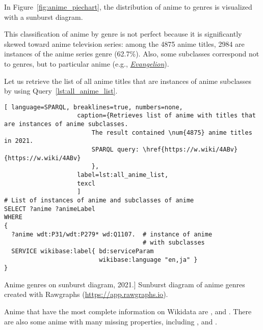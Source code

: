 In Figure~\ref{fig:anime_piechart}, the distribution of anime to genres is visualized with a sunburst diagram.

This classification of anime by genre is not perfect because it is significantly skewed toward anime television series: among the \num{4875} anime titles, \num{2984} are instances of the anime series genre (\num{62.7}\%). Also, some subclasses correspond not to genres, but to particular anime (e.g., \href{https://w.wiki/3iKe}{\emph{Evangelion}}).

Let us retrieve the list of all anime titles that are instances of anime subclasses by using Query~\ref{lst:all_anime_list}.

\begin{lstlisting}[ language=SPARQL, breaklines=true, numbers=none,
                    caption={Retrieves list of anime with titles that are instances of anime subclasses.
                        The result contained \num{4875} anime titles in 2021.
                        SPARQL query: \href{https://w.wiki/4ABv}{https://w.wiki/4ABv}
                        },
                    label=lst:all_anime_list,
                    texcl 
                    ]
# List of instances of anime and subclasses of anime
SELECT ?anime ?animeLabel
WHERE
{
  ?anime wdt:P31/wdt:P279* wd:Q1107.  # instance of anime
                                      # with subclasses
  SERVICE wikibase:label{ bd:serviceParam 
                          wikibase:language "en,ja" }
}
\end{lstlisting}%

\begin{marginfigure}[0.0cm]
{
	\setlength{\fboxsep}{0pt}%
	\setlength{\fboxrule}{1pt}%
}
\caption
[Anime genres on sunburst diagram, 2021.]
{
Sunburst diagram of anime genres created with Rawgraphs (\href{https://app.rawgraphs.io}{https://app.rawgraphs.io}).\newline
}
\label{fig:anime_piechart}
\end{marginfigure}

Anime that have the most complete information on Wikidata are ,  and . There are also some anime with many missing properties, including ,  and .

